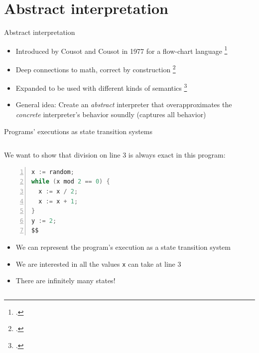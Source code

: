 \documentclass[aspectratio=169]{beamer}
\begin{document}

\section{Abstract interpretation}

\begin{frame}{Abstract interpretation}
  \begin{itemize}[<+->]
  \item Introduced by Cousot and Cousot in 1977 for a flow-chart language \footcite{cousot1977abstract}
  \item Deep connections to math, correct by construction \footcite{cousot1979systematic}
  \item Expanded to be used with different kinds of semantics \footcite{schmidt1998trace,schmidt2009abstract,van2010abstracting,van2012systematic}
  \item General idea: Create an \emph{abstract} interpreter that
    overapproximates the \emph{concrete} interpreter's behavior
    soundly (captures all behavior)
  \end{itemize}
\end{frame}

\begin{frame}[fragile]{Programs' executions as state transition systems}
  \footnotesize
  \begin{columns}[T]
    \begin{column}{0.45\textwidth}
      We want to show that division on line 3 is always exact in this program:

      \begin{lstlisting}[language=Java,numbers=left,mathescape]
x := random;
while (x mod 2 == 0) {
  x := x / 2;
  x := x + 1;
}
y := 2;
$$
\end{lstlisting}
\begin{itemize}
\item<2-> We can represent the program's execution as a state transition system
\item<10-> We are interested in all the values \texttt{x} can take at line 3
\item<12-> There are infinitely many states!
\end{itemize}
    \end{column}
    \begin{column}{0.5\textwidth}
    \end{column}

  \end{columns}
\end{frame}
\end{document}

